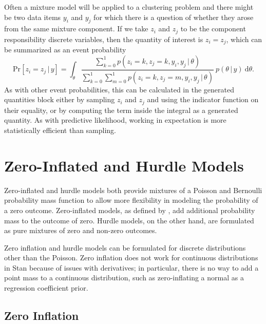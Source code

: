 Often a mixture model will be applied to a clustering problem and
there might be two data items $y_i$ and $y_j$ for which there is a
question of whether they arose from the same mixture component.  If we
take $z_i$ and $z_j$ to be the component responsibility discrete
variables, then the quantity of interest is $z_i = z_j$, which can be
summarized as an event probability
%
\[
\mbox{Pr}[z_i = z_j \, | \, y]
=
\int_{\theta}
\frac{\sum_{k=0}^1 p(z_i=k, z_j = k, y_i, y_j \, | \, \theta)}
     {\sum_{k=0}^1 \sum_{m=0}^1 p(z_i = k, z_j = m, y_i, y_j \, | \,
       \theta)}
\
p(\theta \, | \, y)
\
\mbox{d}\theta.
\]
%
As with other event probabilities, this can be calculated in the
generated quantities block either by sampling $z_i$ and $z_j$ and
using the indicator function on their equality, or by computing the
term inside the integral as a generated quantity.  As with predictive
likelihood, working in expectation is more statistically efficient than
sampling.

\section{Zero-Inflated and Hurdle Models}\label{zero-inflated.section}

Zero-inflated and hurdle models both provide mixtures of a Poisson and
Bernoulli probability mass function to allow more flexibility in
modeling the probability of a zero outcome.  Zero-inflated models, as
defined by \citet{Lambert:1992}, add additional probability mass to
the outcome of zero.  Hurdle models, on the other hand, are formulated
as pure mixtures of zero and non-zero outcomes.

Zero inflation and hurdle models can be formulated for discrete
distributions other than the Poisson.  Zero inflation does not work
for continuous distributions in Stan because of issues with
derivatives; in particular, there is no way to add a point mass to a
continuous distribution, such as zero-inflating a normal as a
regression coefficient prior.


\subsection{Zero Inflation}

